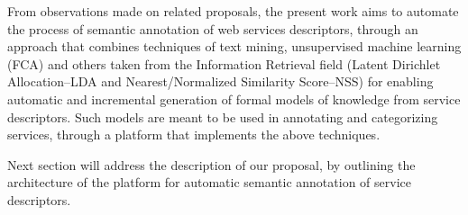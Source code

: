 From observations made on related proposals, the
present work aims to automate the process of semantic annotation of web services descriptors, through an approach that combines techniques of text mining, unsupervised machine learning (FCA) and others taken from the Information Retrieval field (Latent Dirichlet Allocation–LDA and Nearest/Normalized Similarity Score–NSS) for enabling  automatic and incremental generation of formal models of knowledge from service descriptors. Such models are meant to be used in annotating and categorizing services, through a platform that implements the above techniques. 

Next section will address the description of our proposal, by outlining the architecture of the platform for automatic semantic annotation of service descriptors.
